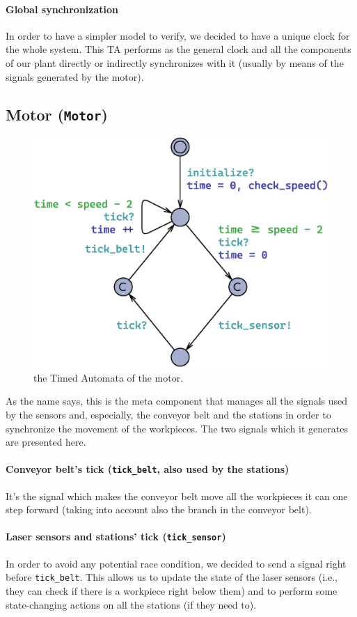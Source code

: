 \documentclass[a4paper]{article}
\begin{document}
    \paragraph{Global synchronization} In order to have a simpler model to verify, we decided to have a unique clock for the whole system. This TA performs as the general clock and all the components of our plant directly or indirectly synchronizes with it (usually by means of the signals generated by the motor).

    \subsection{Motor (\texttt{Motor})}

    \begin{figure}[h!]
        \centering
        \includegraphics[width=0.3\columnwidth]{./images/automata/motor}
        \caption{the Timed Automata of the motor.}
    \end{figure}

    As the name says, this is the meta component that manages all the signals used by the sensors and, especially, the conveyor belt and the stations in order to synchronize the movement of the workpieces. The two signals which it generates are presented here.

    \paragraph{Conveyor belt's tick (\texttt{tick\_belt}, also used by the stations)} It's the signal which makes the conveyor belt move all the workpieces it can one step forward (taking into account also the branch in the conveyor belt).

    \paragraph{Laser sensors and stations' tick (\texttt{tick\_sensor})} In order to avoid any potential race condition, we decided to send a signal right before \texttt{tick\_belt}. This allows us to update the state of the laser sensors (i.e., they can check if there is a workpiece right below them) and to perform some state-changing actions on all the stations (if they need to).
\end{document}
